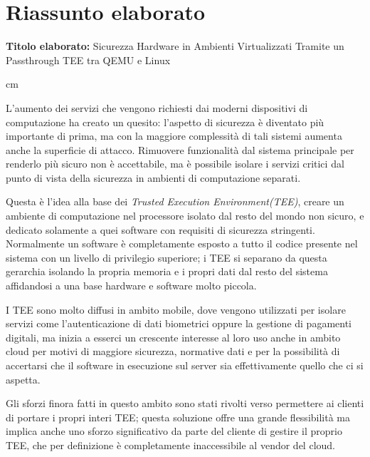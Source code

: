 \documentclass[12pt,italian]{report}
\begin{document}
\chapter*{Riassunto elaborato}


\textbf{Titolo elaborato:} Sicurezza Hardware in Ambienti Virtualizzati Tramite un Passthrough TEE tra QEMU e Linux

 cm

L'aumento dei servizi che vengono richiesti dai moderni dispositivi di
computazione ha creato un quesito: l'aspetto di sicurezza è diventato più
importante di prima, ma con la maggiore complessità di tali sistemi aumenta
anche la superficie di attacco.
Rimuovere funzionalità dal sistema principale per renderlo più sicuro non
è accettabile, ma è possibile isolare i servizi critici dal punto di vista
della sicurezza in ambienti di computazione separati.

Questa è l'idea alla base dei \textit{Trusted Execution Environment(TEE)},
creare un ambiente di computazione nel processore isolato dal resto del
mondo non sicuro\cite{sabt2015tee}, e dedicato solamente a quei software
con requisiti di sicurezza stringenti.
Normalmente un software è completamente esposto a tutto il codice
presente nel sistema con un livello di privilegio superiore;
i TEE si separano da questa gerarchia isolando la propria memoria e i propri
dati dal resto del sistema affidandosi a una base hardware e software
molto piccola.

I TEE sono molto diffusi in ambito mobile, dove vengono utilizzati per
isolare servizi come l'autenticazione di dati biometrici\cite{androidbiometrics}
oppure la gestione di pagamenti digitali\cite{secure_payments}, ma inizia a esserci
un crescente interesse al loro
uso anche in ambito cloud\cite{confidential_computing_consortium} per
motivi di maggiore sicurezza,
normative dati e per la possibilità di accertarsi che il software
in esecuzione sul server sia effettivamente quello che ci si aspetta.

Gli sforzi finora fatti in questo ambito sono stati rivolti verso permettere
ai clienti di portare i propri interi TEE; questa soluzione offre una grande
flessibilità ma implica anche uno sforzo significativo da parte del cliente
di gestire il proprio TEE, che per definizione è completamente inaccessibile
al vendor del cloud.
\end{document}

